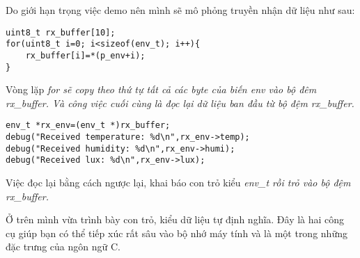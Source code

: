 Do giới hạn trọng việc demo nên mình sẽ mô phỏng truyền nhận dữ liệu như sau:

\begin{lstlisting}
uint8_t rx_buffer[10];
for(uint8_t i=0; i<sizeof(env_t); i++){
    rx_buffer[i]=*(p_env+i);
}
\end{lstlisting}

Vòng lặp \it{for} sẽ copy theo thứ tự tất cả các byte của biến \it{env} vào bộ đêm \it{rx\_buffer}. Và công việc cuối cùng là đọc lại dữ liệu ban đầu từ bộ đệm \it{rx\_buffer}.

\begin{lstlisting}
env_t *rx_env=(env_t *)rx_buffer;
debug("Received temperature: %d\n",rx_env->temp);
debug("Received humidity: %d\n",rx_env->humi);
debug("Received lux: %d\n",rx_env->lux);
\end{lstlisting}

Việc đọc lại bằng cách ngược lại, khai báo con trỏ kiểu \it{env\_t} rồi trỏ vào bộ đệm \it{rx\_buffer}.

Ở trên mình vừa trình bày con trỏ, kiểu dữ liệu tự định nghĩa. Đây là hai công cụ giúp bạn có thể tiếp xúc rất sâu vào bộ nhớ máy tính và là một trong những đặc trưng của ngôn ngữ C.


